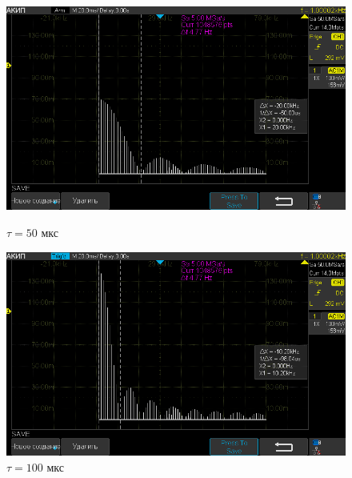\begin{figure}[H]
	\centering
	\begin{minipage}[b]{.5\textwidth}
		\vspace*{-10pt}
		\centering
		\includegraphics[width=0.9\linewidth]{"../photos/impulse1.png"}
		\caption*{$\tau = 50$ мкс}
		\vspace*{-20pt}
	\end{minipage}%
	\begin{minipage}[b]{.5\textwidth}
		\vspace*{-10pt}
		\centering
		\includegraphics[width=0.9\linewidth]{"../photos/impulse5.png"}
		\caption*{$\tau = 100$ мкс}
		\vspace*{-20pt}
	\end{minipage}
\end{figure}

